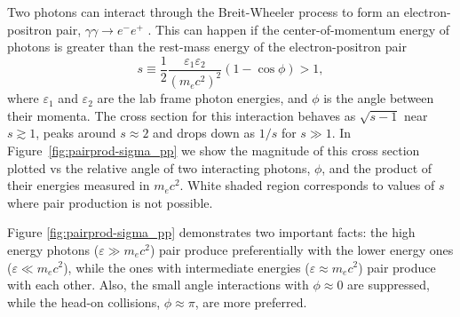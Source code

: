 Two photons can interact through the Breit-Wheeler process to form an electron-positron pair, $\gamma\gamma\to e^-e^+$ \citep{PhysRev.46.1087}. This can happen if the center-of-momentum energy of photons is greater than the rest-mass energy of the electron-positron pair
\begin{equation}
    \label{eq:def_s}
    s \equiv \frac{1}{2}\frac{\varepsilon_1\varepsilon_2}{(m_e c^2)^2} (1-\cos{\phi}) > 1,
\end{equation}
where $\varepsilon_1$ and $\varepsilon_2$ are the lab frame photon energies, and $\phi$ is the angle between their momenta. The cross section for this interaction behaves as $\sqrt{s-1}$ near $s\gtrsim 1$, peaks around $s\approx 2$ and drops down as $1/s$ for $s\gg 1$. In Figure~\ref{fig:pairprod-sigma_pp} we show the magnitude of this cross section plotted vs the relative angle of two interacting photons, $\phi$, and the product of their energies measured in $m_ec^2$. White shaded region corresponds to values of $s$ where pair production is not possible.

Figure \ref{fig:pairprod-sigma_pp} demonstrates two important facts: the high energy photons ($\varepsilon \gg m_e c^2$) pair produce preferentially with the lower energy ones ($\varepsilon \ll m_e c^2$), while the ones with intermediate energies ($\varepsilon \approx m_e c^2$) pair produce with each other. Also, the small angle interactions with $\phi\approx 0$ are suppressed, while the head-on collisions, $\phi\approx \pi$, are more preferred.

\begin{figure}[htb]
\end{figure}

